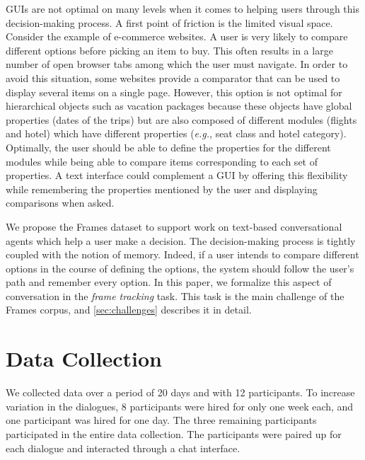 \documentclass{article}
\theoremstyle{definition}
\begin{document}
GUIs are not optimal on many levels when it comes to helping users through this decision-making process. A first point of friction is the limited visual space. Consider the example of e-commerce websites. A user is very likely to compare different options before picking an item to buy. This often results in a large number of open browser tabs among which the user must navigate. In order to avoid this situation, some websites provide a comparator that can be used to display several items on a single page. However, this option is not optimal for hierarchical objects such as vacation packages because these objects have global properties (dates of the trips) but are also composed of different modules (flights and hotel) which have different properties (\textit{e.g.}, seat class and hotel category). Optimally, the user should be able to define the properties for the different modules while being able to compare items corresponding to each set of properties. A text interface could complement a GUI by offering this flexibility while remembering the properties mentioned by the user and displaying comparisons when asked. 

We propose the Frames dataset to support work on text-based conversational agents which help a user make a decision. The decision-making process is tightly coupled with the notion of memory. Indeed, if a user intends to compare different options in the course of defining the options, the system should follow the user's path and remember every option. In this paper, we formalize this aspect of conversation in the \emph{frame tracking} task. This task is the main challenge of the Frames corpus, and \cref{sec:challenges} describes it in detail.

\section{Data Collection}
\label{sec:data_collection}
We collected data over a period of 20 days and with 12 participants. To increase variation in the dialogues, 8 participants were hired for only one week each, and one participant was hired for one day. The three remaining participants participated in the entire data collection. The participants were paired up for each dialogue and interacted through a chat interface.
\end{document}
